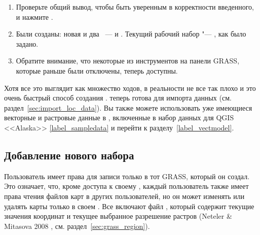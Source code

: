 \begin{enumerate}
  новой . Вы можете называть его как угодно "--- мы
  используем имя <<demo>>.
  \footnote{Когда создается новая , GRASS автоматически
  создает специальный , называемый ,
  спроектированный для хранения главных данных проекта, его исходного
  пространственного охвата и определений системы координат
  (Neteler \& Mitasova 2008 \cite{neteler_mitasova08}).}
  \item Проверьте общий вывод, чтобы быть уверенным в корректности
  введенного, и нажмите .
\item Были созданы: новая   и два ~---
     и . Текущий
  рабочий набор "--- , как было задано.
  \item Обратите внимание, что некоторые из инструментов на панели
  GRASS, которые раньше были отключены, теперь доступны.
\end{enumerate}

Хотя все это выглядит как множество ходов, в реальности не все так плохо
и это очень быстрый способ создания .
 теперь готова для импорта данных (см.
раздел~\ref{sec:import_loc_data}). Вы также можете использовать уже
имеющиеся векторные и растровые данные в ,
включенные в набор данных для QGIS <<Alaska>> \ref{label_sampledata} и
перейти к разделу~\ref{label_vectmodel}.

\subsection{Добавление нового набора}\label{sec:add_mapset}

Пользователь имеет права для записи только в тот 
GRASS, который он создал. Это означает, что, кроме доступа к своему
, каждый пользователь также имеет права чтения файлов карт в
 других пользователей, но он может изменять или
удалять карты только в своем . Все 
включают файл , который содержит текущие значения
координат и текущее выбранное разрешение растров (Neteler \& Mitasova 2008
\cite{neteler_mitasova08}, см. раздел~\ref{sec:grass_region}).

